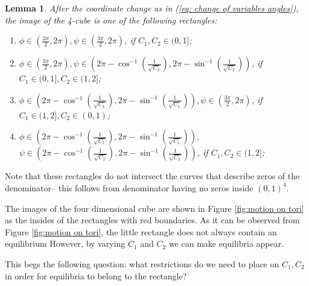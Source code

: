 \documentclass{article}
\newtheorem{lemma}[theorem]{Lemma}
\theoremstyle{definition}
\numberwithin{equation}{section}
\begin{document}
\begin{lemma}
\label{st: lemma intervals of angles}
After the coordinate change as in (\ref{eq: change of variables angles}), the image of the 4-cube is one of the following rectangles:
\begin{enumerate}
    \item $\phi\in\left(\frac{3\pi}{2}, 2\pi\right),\psi\in\left(\frac{3\pi}{2}, 2\pi\right)$, if $C_1,C_2\in(0,1]$;
    \item  $\phi\in\left(\frac{3\pi}{2}, 2\pi\right),\psi\in\left(2 \pi -\cos ^{-1}\left(\frac{1}{\sqrt{C_2}}\right), 2 \pi -\sin ^{-1}\left(\frac{1}{\sqrt{C_2}}\right)\right)$, if $C_1\in(0,1],C_2\in(1,2]$;
    \item  $\phi\in\left(2 \pi -\cos ^{-1}\left(\frac{1}{\sqrt{C_1}}\right), 2 \pi -\sin ^{-1}\left(\frac{1}{\sqrt{C_1}}\right)\right),\psi\in\left(\frac{3\pi}{2}, 2\pi\right)$, if $C_1\in(1,2],C_2\in(0,1)$;
    \item  $\phi\in\left(2 \pi -\cos ^{-1}\left(\frac{1}{\sqrt{C_1}}\right), 2 \pi -\sin ^{-1}\left(\frac{1}{\sqrt{C_1}}\right)\right),\ $ $\psi\in\left(2 \pi -\cos ^{-1}\left(\frac{1}{\sqrt{C_2}}\right), 2 \pi -\sin ^{-1}\left(\frac{1}{\sqrt{C_2}}\right)\right)$, if $C_1,C_2\in(1,2]$;
\end{enumerate}
\end{lemma}

Note that these rectangles do not intersect the curves that describe zeros of the denominator-- this follows from denominator having no zeros inside $(0,1)^4$. 

The images of the four dimensional cube  are shown in Figure \ref{fig:motion on tori} as the insides of the rectangles with red boundaries. As it can be observed from Figure \ref{fig:motion on tori}, the little rectangle does not always contain an equilibrium However, by varying $C_1$ and $C_2$ we can make equilibria appear. 

This begs the following question: what restrictions do we need to place on $C_1,C_2$ in order for equilibria to belong to the rectangle?
\end{document}
